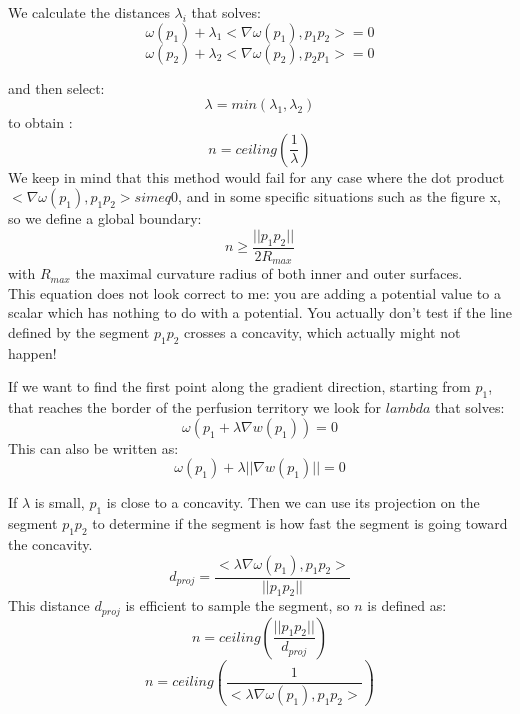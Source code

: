 \documentclass[11pt,a4paper]{article}
\begin{document}
We calculate the distances $\lambda_i$ that solves:
\begin{equation}
\omega (p_1) + \lambda_1 <\nabla \omega(p_1), p_1p_2> = 0 
\end{equation}
\begin{equation}
\omega (p_2) + \lambda_2 <\nabla \omega(p_2), p_2p_1> = 0
\end{equation}

and then select:
\begin{equation}
\lambda = min(\lambda_1, \lambda_2)
\end{equation}
to obtain :
\begin{equation}
n = ceiling(\frac{1}{\lambda})
\end{equation}
We keep in mind that this method would fail for any case where the dot product $<\nabla \omega(p_1), p_1p_2> simeq 0$, and in some specific situations such as the figure x, so we define a global boundary:
\begin{equation}
n \geq \frac{||p_1p_2||}{2R_{max}}
\end{equation}
with $R_{max}$ the maximal curvature radius of both inner and outer surfaces.\\

This equation does not look correct to me: you are adding a potential value to a scalar which has nothing to do with a potential.
You actually don't test if the line defined by the segment $p_1p_2$ crosses a concavity, which actually might not happen!

If we want to find the first point along the gradient direction, starting from $p_1$, that reaches the border of the perfusion territory we look for $lambda$ that solves:
\begin{equation}
\omega( p_1 + \lambda \nabla w(p_1)) = 0
\end{equation}
This can also be written as:
\begin{equation}
\omega(p_1) + \lambda ||\nabla w(p_1)|| = 0
\end{equation}

If $\lambda$ is small, $p_1$ is close to a concavity. 
Then we can use its projection on the segment $p_1p_2$ to determine if the segment is how fast the segment is going toward the concavity.
\begin{equation}
 d_{proj} = \frac{< \lambda \nabla \omega(p_1), p_1p_2>}{||p_1p_2||}
\end{equation}
This distance $d_{proj}$ is efficient to sample the segment, so $n$ is defined as:
\begin{equation}
n = ceiling(\frac{||p_1p_2||}{d_{proj}})
\end{equation}
\begin{equation}
n = ceiling(\frac{1}{< \lambda \nabla \omega(p_1), p_1p_2>})
\end{equation}
\end{document}
